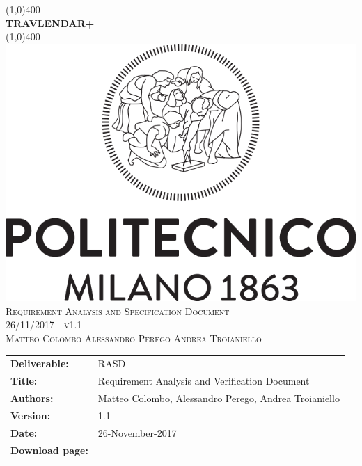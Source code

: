 



\begin{titlepage}
	\begin{center}
		\line(1,0){400}\\	[0.6cm]
		\Huge{\bfseries{TRAVLENDAR+}}\\
		\line(1,0){400}\\
		[3cm]
		\includegraphics[scale=0.3]{Images/polimi}\\
		[3cm]
		\textsc{\Huge Requirement Analysis and Specification Document}\\[1cm]
		\textsc{\huge 26/11/2017 - v1.1}\\
		[4cm]
		\textsc{\normalsize Matteo Colombo \hspace{0.4cm} Alessandro Perego \hspace{0.4cm} Andrea Troianiello }
	\end{center}
\end{titlepage}
	
\begin{table}[h!]
\begin{tabu} to \textwidth { X[0.3,r,p] X[0.7,l,p] }
\hline

\textbf{Deliverable:} & RASD\\
\textbf{Title:} & Requirement Analysis and Verification Document \\
\textbf{Authors:} & Matteo Colombo, Alessandro Perego, Andrea Troianiello \\
\textbf{Version:} & 1.1 \\ 
\textbf{Date:} & 26-November-2017 \\
\textbf{Download page:} & \href{https://github.com/MatteoColombo/ColomboPeregoTroianiello}{\color{Black}{GitHub - ColomboPeregoTroianiello repository}} \\
\hline
\end{tabu}
\end{table}

